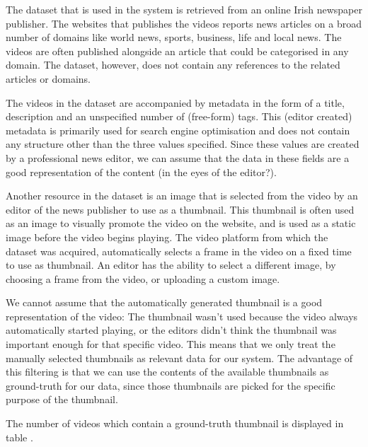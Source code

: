 \documentclass{../resources/acm_proc_article-sp}
\begin{document}
\label{dataset}

The dataset that is used in the system is retrieved from an online Irish newspaper publisher. The websites that publishes the videos reports news articles on a broad number of domains like world news, sports, business, life and local news. The videos are often published alongside an article that could be categorised in any domain. The dataset, however, does not contain any references to the related articles or domains.

The videos in the dataset are accompanied by metadata in the form of a title, description and an unspecified number of (free-form) tags. This (editor created) metadata is primarily used for search engine optimisation and does not contain any structure other than the three values specified. Since these values are created by a professional news editor, we can assume that the data in these fields are a good representation of the content (in the eyes of the editor?).

Another resource in the dataset is an image that is selected from the video by an editor of the news publisher to use as a thumbnail. This thumbnail is often used as an image to visually promote the video on the website, and is used as a static image before the video begins playing. The video platform from which the dataset was acquired, automatically selects a frame in the video on a fixed time to use as thumbnail. An editor has the ability to select a different image, by choosing a frame from the video, or uploading a custom image.

We cannot assume that the automatically generated thumbnail is a good representation of the video: The thumbnail wasn't used because the video always automatically started playing, or the editors didn't think the thumbnail was important enough for that specific video. This means that we only treat the manually selected thumbnails as relevant data for our system. The advantage of this filtering is that we can use the contents of the available thumbnails as ground-truth for our data, since those thumbnails are picked for the specific purpose of the thumbnail.

The number of videos which contain a ground-truth thumbnail is displayed in table . 

\end{document}
